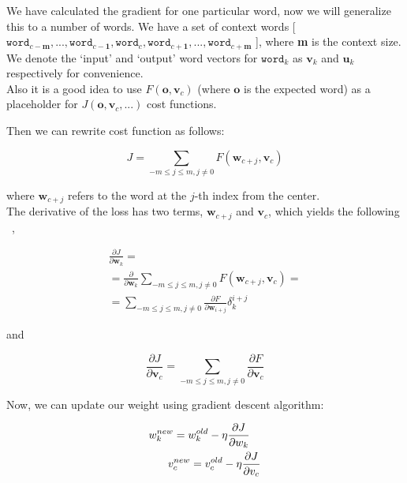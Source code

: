 \noindent We have calculated the gradient for one particular word, now we will generalize this to a number of words. We have a set of context words [$\texttt{word}_{c-\textbf{m}},...,\texttt{word}_{c-\textbf{1}},\texttt{word}_{c},\texttt{word}_{c+\textbf{1}},...,\texttt{word}_{c+\textbf{m}}$ ], where \textbf{m} is the context size. We denote the `input' and `output' word vectors for $\texttt{word}_{k}$ as ${\boldsymbol v}_{k}$ and ${\boldsymbol u}_{k}$ respectively for
convenience. \\

\noindent Also it is a good idea to use $F({\boldsymbol o}, {\boldsymbol v}_{c})$ (where ${\boldsymbol o}$ is the expected word) as a placeholder for $J({\boldsymbol o}, {\boldsymbol v}_{c}, ...)$ cost functions.

\noindent Then we can rewrite cost function as follows:

\begin{equation}
J =   \sum_{-m\le j\le m, j\neq0}F({\boldsymbol w}_{c+j}, {\boldsymbol v}_{c})
\end{equation}

where ${\boldsymbol w}_{c+j}$ refers to the word at the $j$-th index from the center.\\

The derivative of the loss has two terms, ${\boldsymbol w}_{c+j}$ and ${\boldsymbol v}_{c}$, which yields the following ~\cite{assignment1},

\begin{equation}
	\begin{multlined}
	\frac{\partial{J}}{\partial{\boldsymbol w}_{k}} = \\ =\frac{\partial}{\partial{\boldsymbol w}_{k}}\sum_{-m\le j\le m, j\neq0}F({\boldsymbol w}_{c+j}, {\boldsymbol v}_{c})= \\
	= \sum_{-m\le j\le m, j\neq0} \frac{\partial{F}}{\partial{\boldsymbol w}_{i+j}}\delta^{i+j}_{k}
	\end{multlined}
\end{equation}

and

\begin{equation}
\frac{\partial{J}}{\partial{\boldsymbol v}_{c}} = \sum_{-m\le j\le m, j\neq0} \frac{\partial{F}}{\partial{\boldsymbol v}_{c}}
\end{equation}

Now, we can update our weight using gradient descent algorithm:

\begin{equation}\\
	\begin{multlined}
	w^{new}_{k} = w^{old}_{k} - \eta \frac{\partial{J}}{\partial{w}_{k}} \\
	v^{new}_{c} = v^{old}_{c} - \eta \frac{\partial{J}}{\partial{v}_{c}}
	\end{multlined}
\end{equation}

